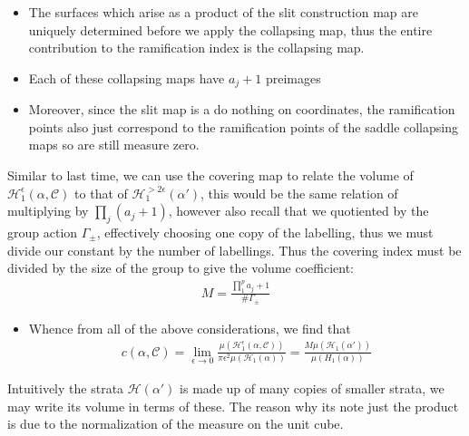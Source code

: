 \documentclass[20pt]{article}
\theoremstyle{definition}
\begin{document}
    \begin{itemize}
        \item The surfaces which arise as a product of the slit construction map are uniquely determined before we apply the collapsing map, thus the entire contribution to the ramification index is the collapsing map.
        \item Each of these collapsing maps have \(a_j + 1\) preimages
        \item Moreover, since the slit map is a do nothing on coordinates, the ramification points also just correspond to the ramification points of the saddle collapsing maps so are still measure zero. 
    \end{itemize}

    Similar to last time, we can use the covering map to relate the volume of \(\mathcal{H}^\epsilon_1(\alpha,\mathcal{C})\) to that of \(\mathcal{H}_1^{>2 \epsilon}(\alpha')\), this would be the same relation of multiplying by \(\prod_{j}(a_j+1)\), however also recall that we quotiented by the group action \(\Gamma_{\pm}\), effectively choosing one copy of the labelling, thus we must divide our constant by the number of labellings. Thus the covering index must be divided by the size of the group to give the volume coefficient:
    \begin{align*}
        M = \frac{\prod_1^p a_j + 1}{\# \Gamma_{\pm}}
    \end{align*}
    
    \begin{itemize}
        \item Whence from all of the above considerations, we find that
        \begin{align*}
            c(\alpha,\mathcal{C}) = \lim_{\epsilon \to 0} \frac{\mu(\mathcal{H}_1^\epsilon(\alpha,\mathcal{C}))}{\pi \epsilon^2 \mu(\mathcal{H}_1(\alpha))} = \frac{M \mu(\mathcal{H}_1(\alpha'))}{\mathcal\mu({H}_1(\alpha))}
        \end{align*}
    \end{itemize}

    Intuitively the strata \(\mathcal{H}(\alpha')\) is made up of many copies of smaller strata, we may write its volume in terms of these. The reason why its note just the product is due to the normalization of the measure on the unit cube.
\end{document}

